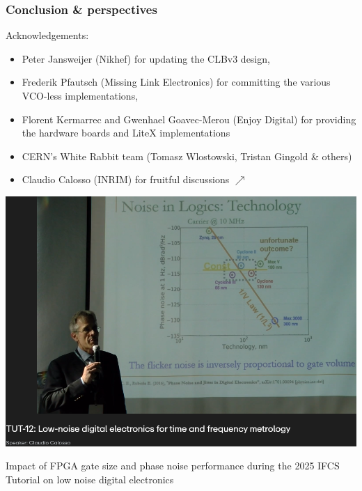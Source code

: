 \documentclass[compress,10pt,aspectratio=169]{beamer}
\begin{document}
\begin{frame}[fragile]\frametitle{Conclusion \& perspectives}

\begin{minipage}[t]{\linewidth}
\begin{minipage}{.55\linewidth}
Acknowledgements: 
\begin{itemize}
    \item Peter Jansweijer (Nikhef) for updating the CLBv3 design, 
    \item Frederik Pfautsch (Missing Link Electronics) for committing the various VCO-less implementations, 
    \item Florent Kermarrec and Gwenhael Goavec-Merou (Enjoy Digital) for providing the
    hardware boards and LiteX implementations
    \item CERN's White Rabbit team (Tomasz Wlostowski, Tristan Gingold \& others) 
    \item Claudio Calosso (INRIM) for fruitful discussions $\nearrow$
    \end{itemize}
\end{minipage}
\begin{minipage}{.49\linewidth}
\includegraphics[width=\linewidth]{figures/2025-05-26-093826_2704x1050_scrot.png}

Impact of FPGA gate size and phase noise performance during the
2025 IFCS Tutorial on low noise digital electronics
\end{minipage}
\end{minipage}
\end{frame}
\end{document}
